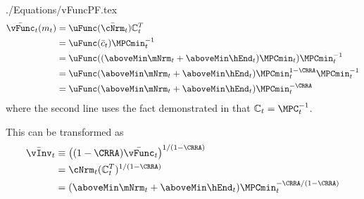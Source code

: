 \documentclass[titlepage, headings=optiontotocandhead]{\econtex}
\begin{document}
\begin{verbatimwrite}{./Equations/vFuncPF.tex}
  \begin{equation}\begin{gathered}\begin{aligned}
        \bar{\vFunc}_{t}({m}_{t})  & = \uFunc(\bar{\cNrm}_{t})\mathbb{C}_{t}^{T}\label{eq:vFuncPF}
        \\  & = \uFunc(\bar{c}_{t}) \MPCmin_{t}^{-1} %
        \\  & = \uFunc((\aboveMin \mNrm_{t}+\aboveMin \hEnd_{t})\MPCmin_{t}) \MPCmin_{t}^{-1} %
        \\  & = \uFunc(\aboveMin \mNrm_{t}+\aboveMin \hEnd_{t})\MPCmin_{t}^{1-\CRRA} \MPCmin_{t}^{-1} %
        \\  & = \uFunc(\aboveMin \mNrm_{t}+\aboveMin \hEnd_{t})\MPCmin_{t}^{-\CRRA}  %
      \end{aligned}\end{gathered}\end{equation}
  where the second line uses the fact demonstrated in \cite{BufferStockTheory} that $\mathbb{C}_{t}=\MPC^{-1}_{t}$. %

  This can be transformed as
  \begin{equation*}\begin{gathered}\begin{aligned}
        \bar{\vInv}_{t}  & \equiv  \left((1-\CRRA)\bar{\vFunc}_{t}\right)^{1/(1-\CRRA)}
        \\  & = \cNrm_{t}(\mathbb{C}_{t}^{T})^{1/(1-\CRRA)}
        \\  & = (\aboveMin \mNrm_{t}+\aboveMin \hEnd_{t})\MPCmin_{t}^{-\CRRA/(1-\CRRA)}   %
      \end{aligned}\end{gathered}\end{equation*}
\end{verbatimwrite}
\unskip
\end{document}
